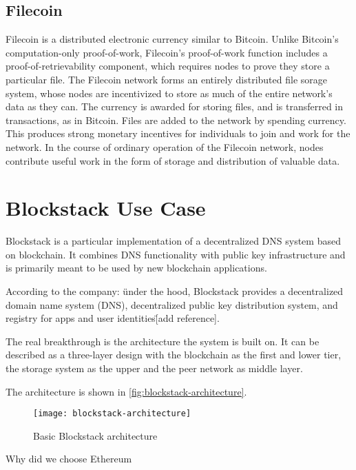 \subsection*{Filecoin}
Filecoin is a distributed electronic currency similar to Bitcoin. Unlike Bitcoin’s computation-only proof-of-work, Filecoin’s proof-of-work function includes a proof-of-retrievability component, which requires nodes to prove they store a particular file. The Filecoin network forms an entirely distributed file sorage system, whose nodes are incentivized to store as much of the entire network’s data as they can. The currency is awarded for storing files, and is transferred in transactions, as in Bitcoin. Files are added to the network by spending currency. This produces strong monetary incentives for individuals to join and work for the network. In the course of ordinary operation of the Filecoin network, nodes contribute useful work in the form of storage and distribution of valuable data.

\section{Blockstack Use Case}
Blockstack is a particular implementation of a decentralized DNS system based on blockchain. It combines DNS functionality with public key infrastructure and is primarily meant to be used by new blockchain applications.

According to the company: \"under the hood, Blockstack provides a decentralized domain name system (DNS), decentralized public key distribution system, and registry for apps and user identities\" [add reference].

The real breakthrough is the architecture the system is built on. It can be described as a three-layer design with the blockchain as the first and lower tier, the storage system as the upper and the peer network as middle layer.

The architecture is shown in \ref{fig:blockstack-architecture}.
\begin{figure}[h]
	\centering
  \texttt{[image: blockstack-architecture]}
	\caption{Basic Blockstack architecture}
	\label{fig1}
\end{figure}

\begin{notation}
	Why did we choose Ethereum
\end{notation}

